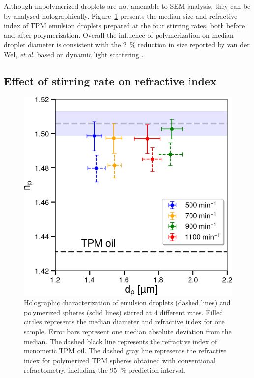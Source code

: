 \documentclass[journal=langd5,manuscript=article,layout=twocolumn]{achemso}
\begin{document}
Although unpolymerized droplets are not amenable to SEM analysis,
they can be by analyzed holographically.
Figure~\ref{fig:jointspeed} presents the median size and refractive index
of TPM emulsion droplets prepared at the four stirring rates,
both before and after polymerization.
Overall the influence of polymerization on median droplet diameter is
consistent with the \SI{2}{\percent} reduction in size reported by
van der Wel, \emph{et al.}
based on dynamic light scattering \cite{vanderwel17}.

\subsection{Effect of stirring rate on refractive index}
\label{sec:stirindex}

\begin{figure}[!t]
\centering
\includegraphics[width=0.9\columnwidth]{jointspeed}
\caption{Holographic characterization of emulsion droplets
(dashed lines) and polymerized spheres (solid lines)
stirred at \num{4} different rates.
Filled circles represents the median diameter and refractive index
for one sample.  Error bars represent one median absolute 
deviation from the median.
The dashed black line represents the refractive index of monomeric
TPM oil.
The dashed gray line represents the refractive index for polymerized
TPM spheres obtained with conventional refractometry, including
the \SI{95}{\percent} prediction interval.}
    \label{fig:jointspeed}
\end{figure}
\end{document}
